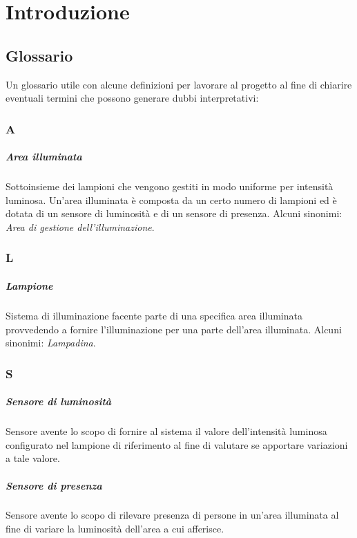 \chapter{Introduzione}

\section{Glossario}
Un glossario utile con alcune definizioni per lavorare al progetto al fine di chiarire eventuali termini che possono generare dubbi interpretativi:

\subsection*{A}

\paragraph{Area illuminata} Sottoinsieme dei lampioni che vengono gestiti in modo uniforme per intensità luminosa. Un'area illuminata è composta da un certo numero di lampioni ed è dotata di un sensore di luminosità e di un sensore di presenza. Alcuni sinonimi: \textit{Area di gestione dell'illuminazione}.

\subsection*{L}
\paragraph{Lampione} Sistema di illuminazione facente parte di una specifica area illuminata provvedendo a fornire l'illuminazione per una parte dell'area illuminata. Alcuni sinonimi: \textit{Lampadina}.

\subsection*{S}
\paragraph{Sensore di luminosità} Sensore avente lo scopo di fornire al sistema il valore dell'intensità luminosa configurato nel lampione di riferimento al fine di valutare se apportare variazioni a tale valore.

\paragraph{Sensore di presenza} Sensore avente lo scopo di rilevare presenza di persone in un'area illuminata al fine di variare la luminosità dell'area a cui afferisce.

